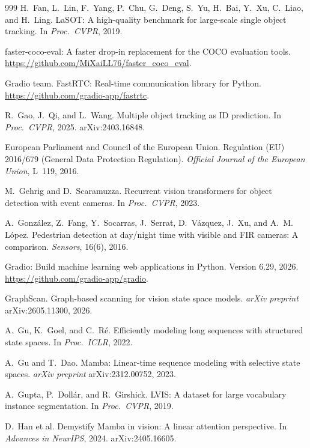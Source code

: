 \begin{thebibliography}{999}
H.~Fan, L.~Lin, F.~Yang, P.~Chu, G.~Deng, S.~Yu, H.~Bai, Y.~Xu, C.~Liao, and H.~Ling.
LaSOT: A high-quality benchmark for large-scale single object tracking.
In \textit{Proc.\ CVPR}, 2019.

faster-coco-eval: A faster drop-in replacement for the COCO evaluation tools.
\url{https://github.com/MiXaiLL76/faster_coco_eval}.

Gradio team.
FastRTC: Real-time communication library for Python.
\url{https://github.com/gradio-app/fastrtc}.

R.~Gao, J.~Qi, and L.~Wang.
Multiple object tracking as ID prediction.
In \textit{Proc.\ CVPR}, 2025. arXiv:2403.16848.

European Parliament and Council of the European Union.
Regulation (EU) 2016/679 (General Data Protection Regulation).
\textit{Official Journal of the European Union}, L~119, 2016.

M.~Gehrig and D.~Scaramuzza.
Recurrent vision transformers for object detection with event cameras.
In \textit{Proc.\ CVPR}, 2023.

A.~Gonz\'alez, Z.~Fang, Y.~Socarras, J.~Serrat, D.~V\'azquez, J.~Xu, and A.~M. L\'opez.
Pedestrian detection at day/night time with visible and FIR cameras: A comparison.
\textit{Sensors}, 16(6), 2016.

Gradio: Build machine learning web applications in Python. Version 6.29, 2026.
\url{https://github.com/gradio-app/gradio}.

GraphScan. Graph-based scanning for vision state space models.
\textit{arXiv preprint} arXiv:2605.11300, 2026.

A.~Gu, K.~Goel, and C.~R\'e.
Efficiently modeling long sequences with structured state spaces.
In \textit{Proc.\ ICLR}, 2022.

A.~Gu and T.~Dao.
Mamba: Linear-time sequence modeling with selective state spaces.
\textit{arXiv preprint} arXiv:2312.00752, 2023.

A.~Gupta, P.~Doll\'ar, and R.~Girshick.
LVIS: A dataset for large vocabulary instance segmentation.
In \textit{Proc.\ CVPR}, 2019.

D.~Han et al.
Demystify Mamba in vision: A linear attention perspective.
In \textit{Advances in NeurIPS}, 2024. arXiv:2405.16605.


\end{thebibliography}
